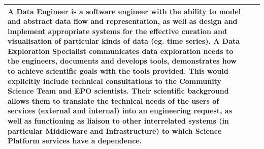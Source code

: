 \begin{longtable} {|p{}|p{}|p{}|}
{A Data Engineer is a software engineer with the ability to model and abstract data flow and representation, as well as design and implement appropriate systems for the effective curation and visualisation of particular kinds of data (eg. time series). 
A Data Exploration Specialist communicates data exploration needs to the engineers, documents and develops tools, demonstrates how to achieve scientific goals with the tools provided. This would explicitly include technical consultations to the Community Science Team and EPO scientists. Their scientific background allows them to translate the technical needs of the users of services (external and internal) into an engineering request, as well as functioning as liaison to other interrelated systems (in particular Middleware and Infrastructure) to which Science Platform services have a dependence.} \\ \hline
\end{longtable} \normalsize
